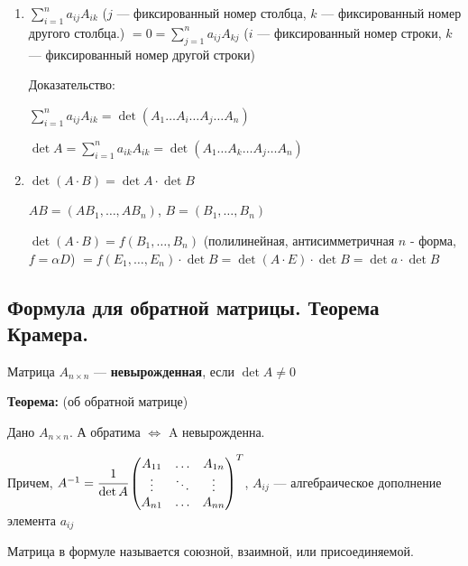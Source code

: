 \documentclass[twoside]{book}
\begin{document}
\begin{enumerate}
    \item \(\sum\limits_{i = 1}^n a_{ij} A_{ik} \) (\(j\) --- фиксированный номер столбца, \(k\) --- фиксированный номер другого столбца.) \( = 0 = \sum\limits_{j = 1}^n a_{ij} A_{kj}\) (\(i\) --- фиксированный номер строки, \(k\) --- фиксированный номер другой строки)


          Доказательство:

          \( \sum\limits_{i=1}^n a_{ij}A_{ik} = \det (A_1\ldots A_i \ldots A_j\ldots A_n)\)

          \(\det A = \sum\limits_{i=1}^n a_{ik}A_{ik} = \det (A_1\ldots A_k \ldots A_j\ldots A_n)\)


    \item \(\det(A \cdot B) = \det A \cdot \det B\)

          \(AB = (AB_1, \ldots, AB_n)\), \(B = (B_1, \ldots, B_n)\)

          \(\det(A \cdot B) = f(B_1, \ldots, B_n)\) (полилинейная, антисимметричная \(n\) - форма, \(f = \alpha D\))
          \(= f(E_1, \ldots, E_n) \cdot \det B = \det(A \cdot E) \cdot \det B = \det a \cdot \det B\)

\end{enumerate}

\subsection{Формула для обратной матрицы. Теорема Крамера.}

Матрица \(A_{n \times n}\) --- \textbf{невырожденная}, если \(\det A \neq 0\)

\textbf{Теорема:} (об обратной матрице)

Дано \(A_{n\times n}\). А обратима $\Leftrightarrow$ A невырожденна.

Причем, \(A^{-1}=\cfrac{1}{\det A}
\begin{pmatrix}
    A_{11} & \ldots & A_{1n} \\
    \vdots & \ddots & \vdots \\
    A_{n1} & \ldots & A_{nn}
\end{pmatrix}^T\), \(A_{ij}\) --- алгебраическое дополнение элемента \(a_{ij}\)


Матрица в формуле называется союзной, взаимной, или присоединяемой.
\end{document}
